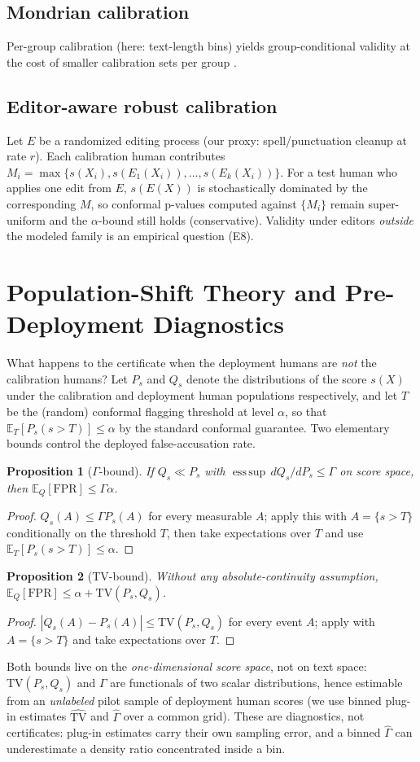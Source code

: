 \documentclass[11pt]{article}
\newtheorem{proposition}{Proposition}
\begin{document}
\subsection{Mondrian calibration}
Per-group calibration (here: text-length bins) yields group-conditional validity at the cost of smaller calibration sets per group \cite{vovk}.
\subsection{Editor-aware robust calibration}
Let $E$ be a randomized editing process (our proxy: spell/punctuation cleanup at rate $r$). Each calibration human contributes $M_i = \max\{s(X_i), s(E_1(X_i)),\dots,s(E_k(X_i))\}$. For a test human who applies one edit from $E$, $s(E(X))$ is stochastically dominated by the corresponding $M$, so conformal p-values computed against $\{M_i\}$ remain super-uniform and the $\alpha$-bound still holds (conservative). Validity under editors \emph{outside} the modeled family is an empirical question (E8).
\section{Population-Shift Theory and Pre-Deployment Diagnostics}\label{sec:theory}
What happens to the certificate when the deployment humans are \emph{not} the calibration humans? Let $P_s$ and $Q_s$ denote the distributions of the score $s(X)$ under the calibration and deployment human populations respectively, and let $T$ be the (random) conformal flagging threshold at level $\alpha$, so that $\mathbb{E}_T[P_s(s>T)]\le\alpha$ by the standard conformal guarantee. Two elementary bounds control the deployed false-accusation rate.
\begin{proposition}[$\Gamma$-bound]
If $Q_s \ll P_s$ with $\operatorname{ess\,sup}\, dQ_s/dP_s \le \Gamma$ on score space, then $\mathbb{E}_{Q}[\mathrm{FPR}] \le \Gamma\alpha$.
\end{proposition}
\begin{proof}
$Q_s(A)\le\Gamma P_s(A)$ for every measurable $A$; apply this with $A=\{s>T\}$ conditionally on the threshold $T$, then take expectations over $T$ and use $\mathbb{E}_T[P_s(s>T)]\le\alpha$.
\end{proof}
\begin{proposition}[TV-bound]
Without any absolute-continuity assumption, $\mathbb{E}_{Q}[\mathrm{FPR}] \le \alpha + \mathrm{TV}(P_s, Q_s)$.
\end{proposition}
\begin{proof}
$|Q_s(A)-P_s(A)|\le \mathrm{TV}(P_s,Q_s)$ for every event $A$; apply with $A=\{s>T\}$ and take expectations over $T$.
\end{proof}
\noindent Both bounds live on the \emph{one-dimensional score space}, not on text space: $\mathrm{TV}(P_s,Q_s)$ and $\Gamma$ are functionals of two scalar distributions, hence estimable from an \emph{unlabeled} pilot sample of deployment human scores (we use binned plug-in estimates $\widehat{\mathrm{TV}}$ and $\widehat\Gamma$ over a common grid). These are diagnostics, not certificates: plug-in estimates carry their own sampling error, and a binned $\widehat\Gamma$ can underestimate a density ratio concentrated inside a bin.
\end{document}
